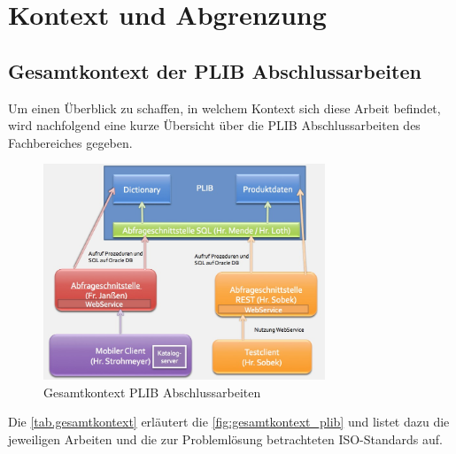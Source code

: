 \section{Kontext und Abgrenzung}

\subsection{Gesamtkontext der PLIB Abschlussarbeiten}

Um einen Überblick zu schaffen, in welchem Kontext sich diese Arbeit befindet, wird nachfolgend eine kurze Übersicht über die PLIB Abschlussarbeiten des Fachbereiches gegeben.


\begin{figure}[htbp]
	\centering
		\includegraphics[width=0.75\textwidth]{images/gesamtkontext_plib.jpg}
	\caption{Gesamtkontext PLIB Abschlussarbeiten}
	\label{fig:gesamtkontext_plib}
\end{figure}

Die \autoref{tab.gesamtkontext} erläutert die \autoref{fig:gesamtkontext_plib} und listet dazu die jeweiligen Arbeiten und die zur Problemlösung betrachteten ISO-Standards auf.

